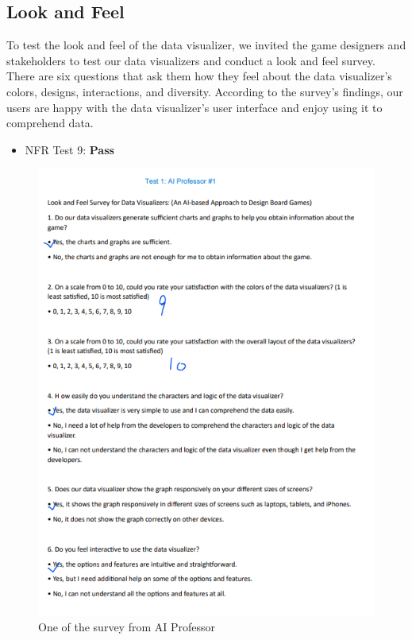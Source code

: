 \documentclass[12pt, titlepage]{article}
\begin{document}
\subsection{Look and Feel}
To test the look and feel of the data visualizer, we invited the game designers and stakeholders to test our data visualizers and conduct a look and feel survey. There are six questions that ask them how they feel about the data visualizer's colors, designs, interactions, and diversity. According to the survey's findings, our users are happy with the data visualizer's user interface and enjoy using it to comprehend data.
\begin{itemize}
    \item NFR Test 9: \textbf{Pass}
\end{itemize}
\newpage
\begin{figure}[!ht]
    \centering
    \includegraphics{ai1.png}
    \caption{One of the survey from AI Professor}
    \label{One of the survey from AI Professor}
\end{figure}
\end{document}
